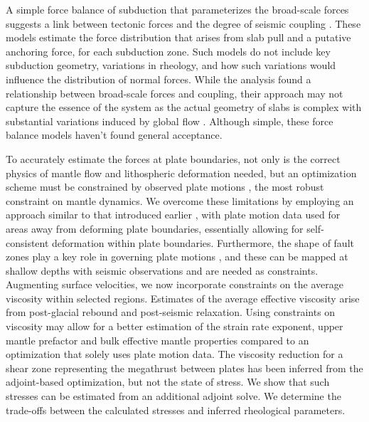 \documentclass[12pt]{article}
\begin{document}
A simple force balance of subduction that parameterizes the broad-scale forces suggests a link between tectonic forces and the degree of seismic coupling \citep{scholz1995mechanism, scholz2012seismic}. 
These models estimate the force distribution that arises from slab pull and a putative anchoring force, for each subduction zone. Such models do not include key subduction geometry, variations in rheology, and how such variations would influence the distribution of  normal forces.  While the analysis found a relationship between broad-scale forces and coupling, their approach may not capture the essence of the system as the actual geometry of slabs is complex with substantial variations induced by global flow \citep{scholz2012seismic}. 
Although simple, these force balance models haven't found general acceptance.


  To accurately estimate the forces at plate boundaries, not only is the correct physics of mantle flow and lithospheric deformation needed, but an optimization scheme must be constrained by observed plate motions \citep{BursteddeStadlerAlisicEtAl13,Stadler27082010}, the most robust constraint on mantle dynamics. We overcome these limitations by employing an approach  similar to that introduced earlier \citep{ratnaswamy2015adjoint}, with plate motion data used for areas away from deforming plate boundaries, essentially allowing for self-consistent deformation within plate boundaries. 
Furthermore, the shape of fault zones play a key role in governing plate motions \citep{Zhong10021995}, and these can be mapped at shallow depths with seismic observations and are needed as constraints.
Augmenting surface velocities, we now incorporate constraints on the average viscosity within selected regions. Estimates of the average effective viscosity arise from post-glacial rebound and post-seismic relaxation. Using constraints on viscosity may allow for a better estimation of the strain rate exponent, upper mantle prefactor and bulk effective mantle properties compared to an optimization that solely uses plate motion data. 
The viscosity reduction for a shear zone representing the megathrust between plates has been inferred from the adjoint-based optimization, but not the state of stress. We show that such stresses can be estimated from an additional adjoint solve.
We determine the trade-offs between the calculated stresses and inferred rheological parameters. 
\end{document}
